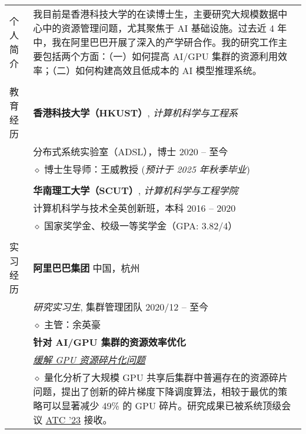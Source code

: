 \documentclass[letterpaper, 10pt]{article}
\begin{document}
\begin{longtable}{p{0.7in}p{6.0in}}

{个人简介}
& 我目前是香港科技大学的在读博士生，主要研究大规模数据中心中的资源管理问题，尤其聚焦于 AI 基础设施。过去近 4 年中，我在阿里巴巴开展了深入的产学研合作。我的研究工作主要包括两个方面：（一）如何提高 AI/GPU 集群的资源利用效率；（二）如何构建高效且低成本的 AI 模型推理系统。 \\
& \\

{教育经历}
& \textbf{香港科技大学（HKUST）}, \textit{计算机科学与工程系} \\
& 分布式系统实验室（ADSL），博士 \hfill 2020 -- 至今 \\
& $\diamond$ 博士生导师：王威教授 \hfill (\textit{预计于 2025 年秋季毕业}) \\
& \\

& \textbf{华南理工大学（SCUT）}, \textit{计算机科学与工程学院} \\
& 计算机科学与技术全英创新班，本科 \hfill 2016 -- 2020 \\
& $\diamond$ 国家奖学金、校级一等奖学金（GPA: 3.82/4） \\
& \\


{实习经历}
& {\textbf{阿里巴巴集团}} \hfill 中国，杭州 \\
& \textit{研究实习生}, 集群管理团队 \hfill 2020/12 -- 至今 \\
& $\diamond$ 主管：余英豪 \\
& \textbf{针对 AI/GPU 集群的资源效率优化} \\

& \textit{\underline{缓解 GPU 资源碎片化问题}} \\

    & $\diamond$ 量化分析了大规模 GPU 共享后集群中普遍存在的资源碎片问题，提出了创新的碎片梯度下降调度算法，相较于最优的策略可以显著减少 49\% 的 GPU 碎片。研究成果已被系统顶级会议 \underline{ATC '23} 接收。 \\


\end{longtable}
\end{document}
